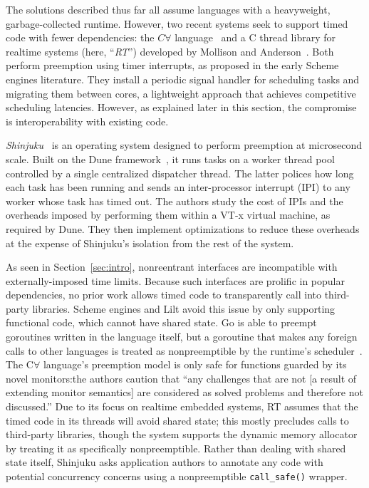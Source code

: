 The solutions described thus far all assume languages with a heavyweight,
garbage-collected runtime.  However, two recent systems seek
to support timed code with fewer dependencies: the $C\forall$
language~\cite{delisle:wcs2018} and a C thread library for realtime systems (here,
``\textit{RT}'') developed by Mollison and Anderson~\cite{mollison:rtas2013}.
Both perform preemption using timer interrupts, as proposed in the early Scheme
engines literature.  They install a periodic signal handler for scheduling
tasks and migrating them between cores, a lightweight approach that achieves
competitive scheduling latencies.
However, as explained later in this section, the compromise is interoperability with
existing code.

\textit{Shinjuku}~\cite{Kaffes:nsdi2019} is an operating system designed to perform
preemption at microsecond scale.  Built on the Dune framework~\cite{Belay:osdi2012},
it runs tasks on a worker thread pool controlled by a single centralized
dispatcher thread.  The latter polices how long each task has been running and
sends an inter-processor interrupt (IPI) to any worker whose task has timed out.
The authors study the cost of IPIs and the overheads
imposed by performing them within a VT-x virtual machine, as required by Dune.  They
then implement optimizations to reduce these overheads at the expense of Shinjuku's
isolation from the rest of the system.

As seen in Section~\ref{sec:intro}, nonreentrant interfaces are
incompatible with externally-imposed time limits.  Because such interfaces are
prolific in popular dependencies, no prior work allows timed code to transparently
call into third-party libraries.  Scheme engines and
Lilt avoid this issue by only supporting functional code, which cannot have shared
state.  Go is able to preempt goroutines written in the language itself, but a
goroutine that makes any foreign calls to other languages is treated as
nonpreemptible by the runtime's scheduler~\cite{www-golang-fficall}.
The C$\forall$ language's preemption model is only safe for functions guarded
by its novel monitors:\@ the authors caution that ``any challenges that are not [a
result of extending monitor semantics] are considered as solved problems and
therefore not discussed.''
Due to its focus on realtime embedded systems, RT assumes
that the timed code in its threads will avoid shared state; this mostly precludes
calls to third-party libraries, though the system supports the dynamic memory
allocator by treating it as specifically nonpreemptible.  Rather than dealing with
shared state itself, Shinjuku asks application authors to annotate any code with
potential concurrency concerns using a nonpreemptible \texttt{call\_safe()} wrapper.
